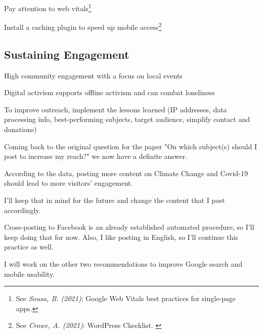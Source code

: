 Pay attention to web vitals\footnote{See \textit{Sousa, B. (2021)}: Google Web Vitals best practices for single-page apps.\cite{webVitals}}

Install a caching plugin to speed up mobile access\footnote{See \textit{Crowe, A. (2021)}: WordPress Checklist. \cite{wpCachePlugin}}

\subsection{Sustaining Engagement}

High community engagement with a focus on local events

Digital activism supports offline activism and can combat loneliness

To improve outreach, implement the lessons learned (IP addresses, data processing info, best-performing subjects, target audience, simplify contact and donations)

Coming back to the original question for the paper "On which subject(s) should I post to increase my reach?" we now have a definite answer.

According to the data, posting more content on Climate Change and Covid-19 should lead to more visitors' engagement.

I'll keep that in mind for the future and change the content that I post accordingly.

Cross-posting to Facebook is an already established automated procedure, so I'll keep doing that for now. Also, I like posting in English, so I'll continue this practice as well.

I will work on the other two recommendations to improve Google search and mobile usability.

